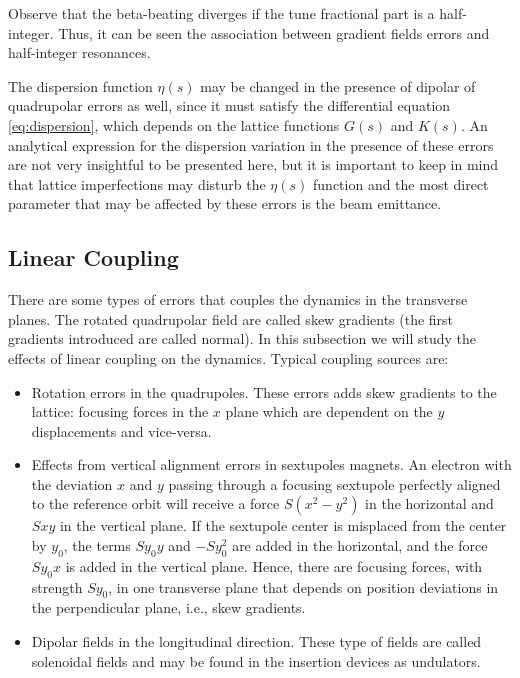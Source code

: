 Observe that the beta-beating diverges if the tune fractional part is a half-integer. Thus, it can be seen the association between gradient fields errors and half-integer resonances.

The dispersion function $\eta(s)$ may be changed in the presence of dipolar of quadrupolar errors as well, since it must satisfy the differential equation \eqref{eq:dispersion}, which depends on the lattice functions $G(s)$ and $K(s)$. An analytical expression for the dispersion variation in the presence of these errors are not very insightful to be presented here, but it is important to keep in mind that lattice imperfections may disturb the $\eta(s)$ function and the most direct parameter that may be affected by these errors is the beam emittance.

\subsection{Linear Coupling}\label{subsec:linear_coupling}

There are some types of errors that couples the dynamics in the transverse planes. The rotated quadrupolar field are called skew gradients (the first gradients introduced are called normal). In this subsection we will study the effects of linear coupling on the dynamics. Typical coupling sources are:

\begin{itemize}
    \item Rotation errors in the quadrupoles. These errors adds skew gradients to the lattice: focusing forces in the $x$ plane which are dependent on the $y$ displacements and vice-versa.
    
    \item Effects from vertical alignment errors in sextupoles magnets. An electron with the deviation $x$ and $y$ passing through a focusing sextupole perfectly aligned to the reference orbit will receive a force $S(x^2-y^2)$ in the horizontal and $Sxy$ in the vertical plane. If the sextupole center is misplaced from the center by $y_0$, the terms $Sy_0 y$ and $-Sy_0^2$ are added in the horizontal, and the force $Sy_0 x$ is added in the vertical plane. Hence, there are focusing forces, with strength $Sy_0$, in one transverse plane that depends on position deviations in the perpendicular plane, i.e., skew gradients.
    
    \item Dipolar fields in the longitudinal direction. These type of fields are called solenoidal fields and may be found in the insertion devices as undulators.
\end{itemize}

